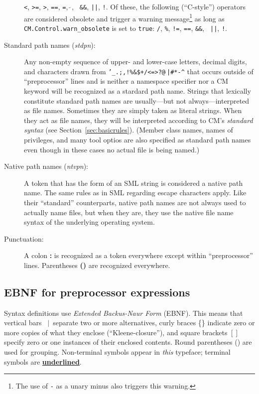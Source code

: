 \documentclass[titlepage,letterpaper]{article}
\newcommand{\nt}[1]{{\it #1}}
\newcommand{\tl}[1]{{\underline{\bf #1}}}
\newcommand{\vb}{~$|$~}
\begin{document}
\begin{description}
{\tt <}, {\tt >=}, {\tt >}, {\tt ==}, {\tt =}, $\tilde{~}$, {\tt
\&\&}, {\tt ||}, {\tt !}.  Of these, the following (``C-style'')
operators are considered obsolete and trigger a warning
message\footnote{The use of {\tt -} as a unary minus also triggers
this warning.} as long as {\tt CM.Control.warn\_obsolete} is set to
{\tt true}: {\tt /}, {\tt \%}, {\tt !=}, {\tt ==}, {\tt \&\&}, {\tt
||}, {\tt !}.
\item[Standard path names (\nt{stdpn}):] Any non-empty sequence of
upper- and lower-case letters, decimal digits, and characters drawn
from {\tt '\_.;,!\%\&\$+/<=>?@$\tilde{~}$|\#*-\verb|^|} that occurs
outside of ``preprocessor'' lines and is neither a namespace specifier
nor a CM keyword will be recognized as a stardard path name.  Strings
that lexically constitute standard path names are usually---but not
always---interpreted as file names. Sometimes they are simply taken as
literal strings.  When they act as file names, they will be
interpreted according to CM's {\em standard syntax} (see
Section~\ref{sec:basicrules}).  (Member class names, names of
privileges, and many tool optios are also specified as standard path
names even though in these cases no actual file is being named.)
\item[Native path names (\nt{ntvpn}):] A token that has the form of an
SML string is considered a native path name.  The same rules as in SML
regarding escape characters apply.  Like their ``standard''
counterparts, native path names are not always used to actually name
files, but when they are, they use the native file name syntax of the
underlying operating system.
\item[Punctuation:] A colon {\bf :} is recognized as a token
everywhere except within ``preprocessor'' lines. Parentheses {\bf ()}
are recognized everywhere.
\end{description}

\subsection{EBNF for preprocessor expressions}

\/ Syntax definitions use {\em
Extended Backus-Naur Form} (EBNF).  This means that vertical bars
\vb separate two or more alternatives, curly braces \{\} indicate
zero or more copies of what they enclose (``Kleene-closure''), and
square brackets $[]$ specify zero or one instances of their enclosed
contents.  Round parentheses () are used for grouping.  Non-terminal
symbols appear in \nt{this}\/ typeface; terminal symbols are
\tl{underlined}.
\end{document}
